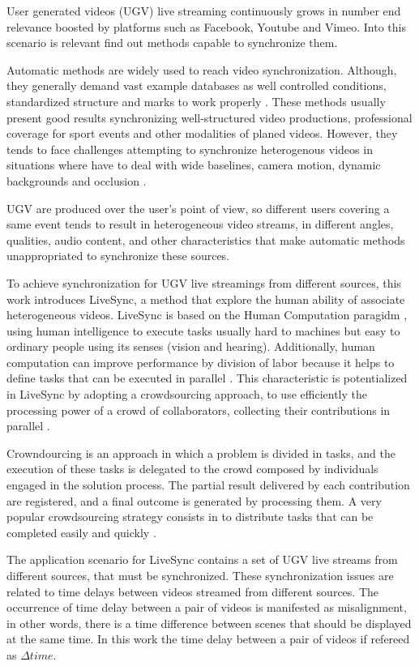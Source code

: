 
User generated videos (UGV) live streaming continuously grows in number end relevance boosted by platforms such as Facebook, Youtube and Vimeo. Into this scenario is relevant find out methods capable to synchronize them. 

Automatic methods are widely used to reach video synchronization. Although, they generally demand vast example databases as well controlled conditions, standardized structure and marks to work properly \cite{wang2014videosnapping}. These methods usually present good results synchronizing well-structured video productions, professional coverage for sport events and other modalities of planed videos. However, they tends to face challenges attempting to synchronize heterogenous videos in situations where have to deal with wide baselines, camera motion, dynamic backgrounds and occlusion \cite{schweiger2013fully}.

UGV are produced over the user's point of view, so different users covering a same event tends to result in heterogeneous video streams, in different angles, qualities, audio content, and other characteristics that make automatic methods unappropriated to synchronize these sources.

To achieve synchronization for UGV live streamings from different sources,  this work introduces LiveSync, a method that explore the human ability of associate  heterogeneous videos. LiveSync is based on the Human Computation paragidm \cite{VonAhn:2005:HC:1168246}, using human intelligence to execute tasks usually hard to machines but easy to ordinary people using its senses (vision and hearing). Additionally, human computation can improve performance by division of labor because it helps to define tasks that can be executed in parallel \cite{Rohwer:2010:NHC:1837885.1837897}. This characteristic is potentialized in LiveSync by adopting a crowdsourcing approach, to use efficiently the processing power of a crowd of collaborators, collecting their contributions in parallel \cite{howe2006rise} . 

Crowndourcing is an approach in which a problem is divided in tasks, and the execution of these tasks is delegated to the crowd composed by individuals engaged in the solution process. The partial result delivered by each contribution are registered, and a final outcome is generated by processing them. A very popular crowdsourcing strategy consists in to distribute tasks that can be completed easily and quickly \cite{Difallah:2015:DMC:2736277.2741685}.

The application scenario for LiveSync contains a set of UGV live streams from different sources, that must be synchronized. These synchronization issues are related to time delays between videos streamed from different sources. The occurrence of time delay between a pair of videos is manifested as misalignment, in other words, there is a time difference between scenes that should be displayed at the same time.  In this work the time delay between a pair of videos if refereed as $\Delta{time}$.

